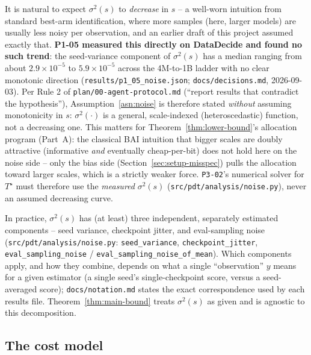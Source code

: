 \begin{remark}
\label{rem:noise-not-monotone}
It is natural to expect $\sigma^2(s)$ to \emph{decrease} in $s$ -- a well-worn
intuition from standard best-arm identification, where more samples (here, larger
models) are usually less noisy per observation, and an earlier draft of this project
assumed exactly that. \textbf{P1-05 measured this directly on DataDecide and found no
such trend}: the seed-variance component of $\sigma^2(s)$ has a median ranging from
about $2.9 \times 10^{-5}$ to $5.9 \times 10^{-5}$ across the 4M-to-1B ladder with no
clear monotonic direction (\texttt{results/p1\_05\_noise.json};
\texttt{docs/decisions.md}, 2026-09-03). Per Rule 2 of \texttt{plan/00-agent-protocol.md}
(``report results that contradict the hypothesis''), Assumption~\ref{asn:noise} is
therefore stated \emph{without} assuming monotonicity in $s$: $\sigma^2(\cdot)$ is a
general, scale-indexed (heteroscedastic) function, not a decreasing one. This matters
for Theorem~\ref{thm:lower-bound}'s allocation program (Part~A): the classical BAI
intuition that bigger scales are doubly attractive (informative \emph{and} eventually
cheap-per-bit) does not hold here on the noise side -- only the bias side
(Section~\ref{sec:setup-misspec}) pulls the allocation toward larger scales, which is a
strictly weaker force. \texttt{P3-02}'s numerical solver for $T^\star$ must therefore
use the \emph{measured} $\sigma^2(s)$ (\texttt{src/pdt/analysis/noise.py}), never an
assumed decreasing curve.
\end{remark}

In practice, $\sigma^2(s)$ has (at least) three independent, separately estimated
components -- seed variance, checkpoint jitter, and eval-sampling noise
(\texttt{src/pdt/analysis/noise.py}: \texttt{seed\_variance}, \texttt{checkpoint\_jitter},
\texttt{eval\_sampling\_noise} / \texttt{eval\_sampling\_noise\_of\_mean}). Which
components apply, and how they combine, depends on what a single ``observation'' $y$
means for a given estimator (a single seed's single-checkpoint score, versus a
seed-averaged score); \texttt{docs/notation.md} states the exact correspondence used
by each results file. Theorem~\ref{thm:main-bound} treats $\sigma^2(s)$ as given and is
agnostic to this decomposition.

\subsection{The cost model}
\label{sec:setup-cost}

